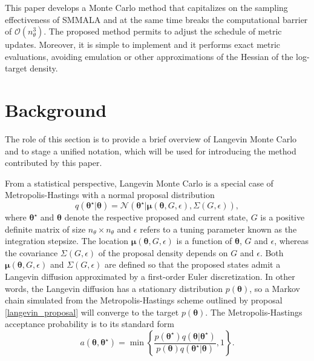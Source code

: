 \documentclass[twoside,11pt]{article}
\begin{document}
This paper develops a Monte Carlo method that capitalizes on the sampling effectiveness of SMMALA and at the same time 
breaks the computational barrier of $\mathcal{O}(n_\theta^3)$. The proposed method permits to adjust the schedule of metric
updates. Moreover, it is simple to implement and it performs exact metric evaluations, avoiding emulation or other 
approximations of the Hessian of the log-target density.

\section{Background}

The role of this section is to provide a brief overview of Langevin Monte Carlo and to stage a unified notation, which will
be used for introducing the method contributed by this paper.

From a statistical perspective, Langevin Monte Carlo is a special case of Metropolis-Hastings with a normal proposal
distribution
\begin{equation}
\label{langevin_proposal}
q(\boldsymbol{\theta}^{\star}|\boldsymbol{\theta}) =
\mathcal{N}(\boldsymbol{\theta}^{\star}|\boldsymbol{\mu}(\boldsymbol{\theta}, G, \epsilon), \Sigma(G, \epsilon)),
\end{equation}
where $\boldsymbol{\theta}^{\star}$ and $\boldsymbol{\theta}$ denote the respective proposed and current state, $G$ is a
positive definite matrix of size $n_{\theta} \times n_{\theta}$ and $\epsilon$ refers to a tuning parameter known as the
integration stepsize. The location $\boldsymbol{\mu}(\boldsymbol{\theta}, G, \epsilon)$ is a function of 
$\boldsymbol{\theta}$, $G$ and $\epsilon$, whereas the covariance $\Sigma(G, \epsilon)$ of the proposal density depends on 
$G$ and $\epsilon$. Both $\boldsymbol{\mu}(\boldsymbol{\theta}, G, \epsilon)$ and $\Sigma(G, \epsilon)$ are defined so that 
the proposed states admit a Langevin diffusion approximated by a first-order Euler discretization. In other words, the 
Langevin diffusion has a stationary distribution $p(\boldsymbol{\theta})$, so a Markov chain simulated from the 
Metropolis-Hastings scheme outlined by proposal \eqref{langevin_proposal} will converge to the target 
$p(\boldsymbol{\theta})$. The Metropolis-Hastings acceptance probability is to its standard form
\begin{equation}
\label{langevin_acceptance}
a(\boldsymbol{\theta},\boldsymbol{\theta}^{\star}) =
\min\left\{
\frac{p(\boldsymbol{\theta}^{\star})q(\boldsymbol{\theta}|\boldsymbol{\theta}^{\star})}
{p(\boldsymbol{\theta})q(\boldsymbol{\theta}^{\star}|\boldsymbol{\theta})}
, 1
\right\}.
\end{equation}
\end{document}
